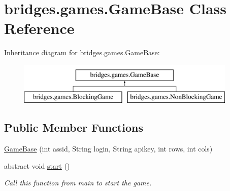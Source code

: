 \hypertarget{classbridges_1_1games_1_1_game_base}{}\section{bridges.\+games.\+Game\+Base Class Reference}
\label{classbridges_1_1games_1_1_game_base}
Inheritance diagram for bridges.\+games.\+Game\+Base\+:\begin{figure}[H]
\begin{center}
\leavevmode
\includegraphics[height=2.000000cm]{classbridges_1_1games_1_1_game_base}
\end{center}
\end{figure}
\subsection*{Public Member Functions}
\begin{DoxyCompactItemize}
\item 
\hyperlink{classbridges_1_1games_1_1_game_base_ad8a4e75eecc34d629c35f37b640f2466}{Game\+Base} (int assid, String login, String apikey, int rows, int cols)
\item 
abstract void \hyperlink{classbridges_1_1games_1_1_game_base_a4b09bc799726e4a59b1ab039b941b188}{start} ()
\begin{DoxyCompactList}\small\item\em Call this function from main to start the game. \end{DoxyCompactList}\end{DoxyCompactItemize}
